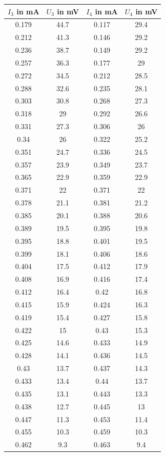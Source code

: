 \documentclass[a4paper, 12pt]{scrartcl}
\begin{document}
\begin{table}[H]\begin{tabular}{|c|c|c|c|}\hline
$I_3$ in mA&$U_3$ in mV&$I_4$ in mA&$U_4$ in mV\\\hline\hline
0.179	&	44.7	&	0.117	&	29.4\\
0.212	&	41.3	&	0.146	&	29.2\\
0.236	&	38.7	&	0.149	&	29.2\\
0.257	&	36.3	&	0.177	&	29\\
0.272	&	34.5	&	0.212	&	28.5\\
0.288	&	32.6	&	0.235	&	28.1\\
0.303	&	30.8	&	0.268	&	27.3\\
0.318	&	29	&	0.292	&	26.6\\
0.331	&	27.3	&	0.306	&	26\\
0.34		  &      26	&	0.322	&	25.2\\
0.351		&24.7&	0.336	&	24.5\\
0.357	&	23.9	&	0.349	&	23.7\\
0.365	&	22.9	&	0.359	&	22.9\\
0.371	&	22	&	0.371	&	22\\
0.378	&	21.1	&	0.381	&	21.2\\
0.385	&	20.1	&	0.388	&	20.6\\
0.389	&	19.5	&	0.395	&	19.8\\
0.395	&	18.8	&	0.401	&	19.5\\
0.399	&	18.1	&	0.406	&	18.6\\
0.404	&	17.5	&	0.412	&	17.9\\ 
0.408	&	16.9	&	0.416	&	17.4\\
0.412	&	16.4	&	0.42		  &      16.8\\
0.415	&	15.9	&	0.424		&16.3\\
0.419	&	15.4	&	0.427	&	15.8\\
0.422	&	15	&	0.43		  &      15.3\\
0.425	&	14.6	&	0.433		&14.9\\
0.428	&	14.1	&	0.436	&	14.5\\
0.43		  &      13.7&		0.437&		14.3\\
0.433		&13.4&		0.44	&	        13.7\\
0.435	&	13.1	&	0.443	&	13.3\\
0.438	&	12.7	&	0.445	&	13\\
0.447	&	11.3	&	0.453	&	11.4\\
0.455	&	10.3	&	0.459	&	10.3\\
0.462	&	9.3	&	0.463	&	9.4\\

\end{tabular}
\end{table}
\end{document}
